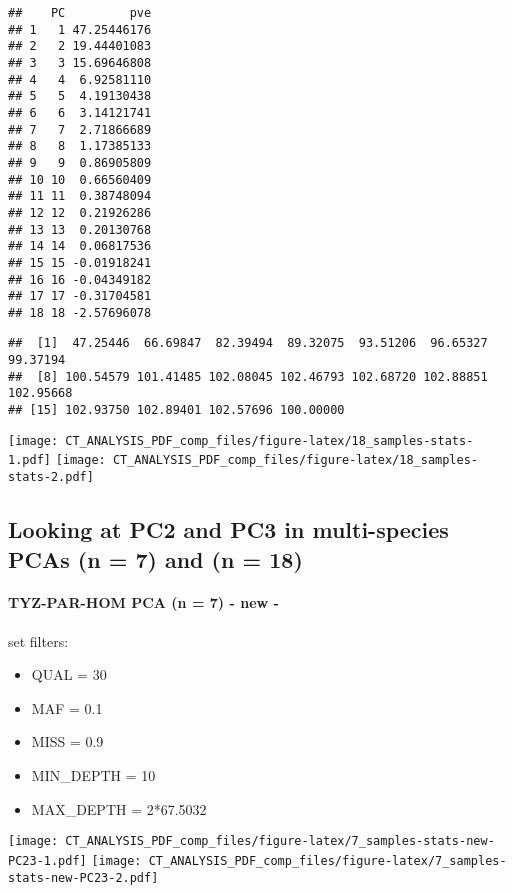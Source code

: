 \documentclass[
]{article}
\providecommand{\tightlist}{%
  \setlength{\itemsep}{0pt}\setlength{\parskip}{0pt}}
\begin{document}
\begin{verbatim}
##    PC         pve
## 1   1 47.25446176
## 2   2 19.44401083
## 3   3 15.69646808
## 4   4  6.92581110
## 5   5  4.19130438
## 6   6  3.14121741
## 7   7  2.71866689
## 8   8  1.17385133
## 9   9  0.86905809
## 10 10  0.66560409
## 11 11  0.38748094
## 12 12  0.21926286
## 13 13  0.20130768
## 14 14  0.06817536
## 15 15 -0.01918241
## 16 16 -0.04349182
## 17 17 -0.31704581
## 18 18 -2.57696078
\end{verbatim}

\begin{verbatim}
##  [1]  47.25446  66.69847  82.39494  89.32075  93.51206  96.65327  99.37194
##  [8] 100.54579 101.41485 102.08045 102.46793 102.68720 102.88851 102.95668
## [15] 102.93750 102.89401 102.57696 100.00000
\end{verbatim}

\texttt{[image: CT\_ANALYSIS\_PDF\_comp\_files/figure-latex/18\_samples-stats-1.pdf]}
\texttt{[image: CT\_ANALYSIS\_PDF\_comp\_files/figure-latex/18\_samples-stats-2.pdf]}

\hypertarget{looking-at-pc2-and-pc3-in-multi-species-pcas-n-7-and-n-18}{%
\subsection{Looking at PC2 and PC3 in multi-species PCAs (n = 7) and (n
= 18)}\label{looking-at-pc2-and-pc3-in-multi-species-pcas-n-7-and-n-18}}

\hypertarget{tyz-par-hom-pca-n-7---new--}{%
\paragraph{TYZ-PAR-HOM PCA (n = 7) - new
-}\label{tyz-par-hom-pca-n-7---new--}}

set filters:

\begin{itemize}
\tightlist
\item
  QUAL = 30
\item
  MAF = 0.1
\item
  MISS = 0.9
\item
  MIN\_DEPTH = 10
\item
  MAX\_DEPTH = 2*67.5032
\end{itemize}

\texttt{[image: CT\_ANALYSIS\_PDF\_comp\_files/figure-latex/7\_samples-stats-new-PC23-1.pdf]}
\texttt{[image: CT\_ANALYSIS\_PDF\_comp\_files/figure-latex/7\_samples-stats-new-PC23-2.pdf]}
\end{document}
